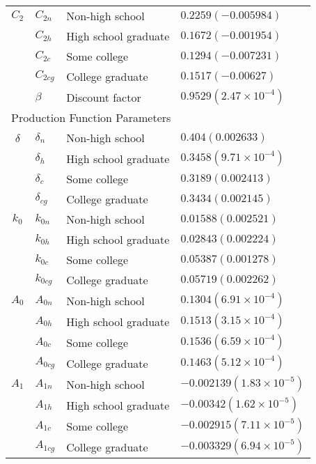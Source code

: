 \documentclass[10pt, letterpaper]{article}
\begin{document}
\begin{longtable}{c l l l}
    $C_2$ &     $C_{2n} $ & Non-high school   & $0.2259 (-0.005984)$\\
    {} &     $C_{2h} $&  High school graduate  &$0.1672 (-0.001954) $\\
    {} &    $C_{2c} $ &   Some college  & $0.1294 (-0.007231)$\\
    {} &     $C_{2cg} $& College graduate   & $0.1517 (-0.00627)$\\
    {} &    $\beta $ &  Discount factor  & $0.9529 (2.47 \times 10^{-4})$\\
    \multicolumn{4}{l}{Production Function Parameters \footnotemark} \\
    $\delta$ &   $\delta_n $ &   Non-high school  & $0.404 (0.002633) $  \\
    {} &   $ \delta_h $&  High school graduate  &  $0.3458 (9.71 \times 10^{-4}) $ \\
    {} &   $ \delta_c$ &  Some college  &  $ 0.3189 (0.002413)$\\
    {} &   $ \delta_{cg}$&  College graduate  & $0.3434 (0.002145) $ \\

    $k_0$ &   $ k_{0n} $ &   Non-high school  &  $ 0.01588 (0.002521)$\\
    {} &   $ k_{0h} $&  High school graduate  &  $ 0.02843 (0.002224)$\\
    {} &   $ k_{0c}$ &  Some college  &  $0.05387 (0.001278) $\\
    {} &   $ k_{0cg}$&  College graduate  & $ 0.05719 (0.002262)$ \\

    $A_0$ &   $ A_{0n} $ &   Non-high school  & $ 0.1304 (6.91  \times 10^{-4})$ \\
    {} &   $ A_{0h} $&  High school graduate  &  $0.1513 (3.15  \times 10^{-4}) $\\
    {} &   $ A_{0c}$ &  Some college  &  $ 0.1536 (6.59  \times 10^{-4})$\\
    {} &   $ A_{0cg}$&  College graduate  & $0.1463 (5.12  \times 10^{-4}) $ \\
    
    $A_1$ &   $ A_{1n} $ &   Non-high school  & $-0.002139 (1.83  \times 10^{-5}) $ \\
    {} &   $ A_{1h} $&  High school graduate  &  $ -0.00342 (1.62  \times 10^{-5})$\\
    {} &   $ A_{1c}$ &  Some college  &  $-0.002915 (7.11  \times 10^{-5}) $\\
    {} &   $ A_{1cg}$&  College graduate  & $-0.003329 (6.94  \times 10^{-5}) $ \\
    

\end{longtable}
\end{document}

